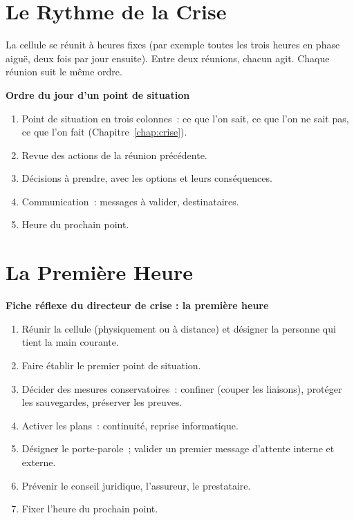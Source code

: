 \section{Le Rythme de la Crise}
\label{sec:c22-rythme}

La cellule se réunit à heures fixes (par exemple toutes les trois heures en
phase aiguë, deux fois par jour ensuite). Entre deux réunions, chacun agit.
Chaque réunion suit le même ordre.

\begin{boxprocedure}
\textbf{Ordre du jour d'un point de situation}
\begin{enumerate}
    \item Point de situation en trois colonnes~: ce que l'on sait, ce que
          l'on ne sait pas, ce que l'on fait (Chapitre~\ref{chap:crise}).
    \item Revue des actions de la réunion précédente.
    \item Décisions à prendre, avec les options et leurs conséquences.
    \item Communication~: messages à valider, destinataires.
    \item Heure du prochain point.
\end{enumerate}
\end{boxprocedure}

\section{La Première Heure}
\label{sec:c22-heure}

\begin{boxprocedure}
\textbf{Fiche réflexe du directeur de crise : la première heure}
\begin{enumerate}
    \item Réunir la cellule (physiquement ou à distance) et désigner la
          personne qui tient la main courante.
    \item Faire établir le premier point de situation.
    \item Décider des mesures conservatoires~: confiner (couper les
          liaisons), protéger les sauvegardes, préserver les preuves.
    \item Activer les plans~: continuité, reprise informatique.
    \item Désigner le porte-parole~; valider un premier message d'attente
          interne et externe.
    \item Prévenir le conseil juridique, l'assureur, le prestataire.
    \item Fixer l'heure du prochain point.
\end{enumerate}
\end{boxprocedure}

